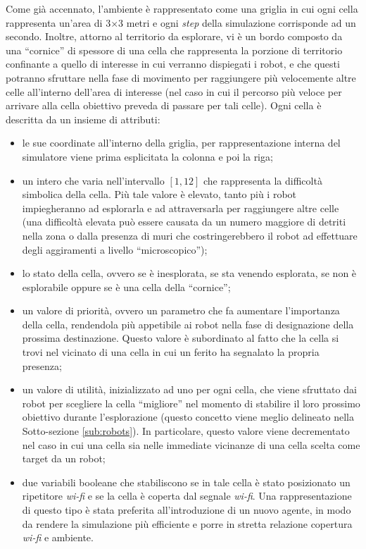 Come già accennato, l'ambiente è rappresentato come una griglia in cui ogni cella rappresenta un'area di 3$\times$3 metri e ogni \textit{step} della simulazione corrisponde ad un secondo.
Inoltre, attorno al territorio da esplorare, vi è un bordo composto da una “cornice” di spessore di una cella che rappresenta la porzione di territorio confinante a quello di interesse in cui verranno dispiegati i robot, e che questi potranno sfruttare nella fase di movimento per raggiungere più velocemente altre celle all'interno dell'area di interesse (nel caso in cui il percorso più veloce per arrivare alla cella obiettivo preveda di passare per tali celle).
Ogni cella è descritta da un insieme di attributi:
\begin{itemize}
	\item le sue coordinate all'interno della griglia, per rappresentazione interna del simulatore viene prima esplicitata la colonna e poi la riga;
	\item un intero che varia nell'intervallo $\left[1, 12\right]$ che rappresenta la difficoltà simbolica della cella. Più tale valore è elevato, tanto più i robot impiegheranno ad esplorarla e ad attraversarla per raggiungere altre celle (una difficoltà elevata può essere causata da un numero maggiore di detriti nella zona o dalla presenza di muri che costringerebbero il robot ad effettuare degli aggiramenti a livello “microscopico”);
	\item lo stato della cella, ovvero se è inesplorata, se sta venendo esplorata, se non è esplorabile oppure se è una cella della “cornice”;
	\item un valore di priorità, ovvero un parametro che fa aumentare l'importanza della cella, rendendola più appetibile ai robot nella fase di designazione della prossima destinazione. Questo valore è subordinato al fatto che la cella si trovi nel vicinato di una cella in cui un ferito ha segnalato la propria presenza;
	\item un valore di utilità, inizializzato ad uno per ogni cella, che viene sfruttato dai robot per scegliere la cella “migliore” nel momento di stabilire il loro prossimo obiettivo durante l'esplorazione (questo concetto viene meglio delineato nella Sotto-sezione \ref{sub:robots}). In particolare, questo valore viene decrementato nel caso in cui una cella sia nelle immediate vicinanze di una cella scelta come target da un robot;
	\item due variabili booleane che stabiliscono se in tale cella è stato posizionato un ripetitore \textit{wi-fi} e se la cella è coperta dal segnale \textit{wi-fi}. Una rappresentazione di questo tipo è stata preferita all'introduzione di un nuovo agente, in modo da rendere la simulazione più efficiente e porre in stretta relazione copertura \textit{wi-fi} e ambiente.
\end{itemize}

